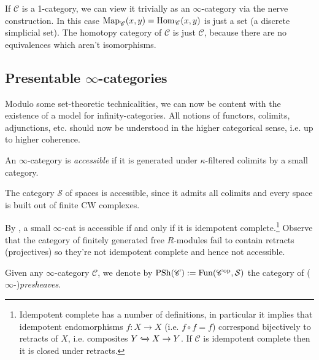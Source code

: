 \documentclass[11pt]{amsart}
\renewcommand{\Pre}{\mathrm{PSh}}
\begin{document}
\begin{example} If $\mathscr{C}$ is a 1-category, we can view it trivially as an $\infty$-category via the nerve construction. In this case $\mathrm{Map}_\mathscr{C}(x,y) = \mathrm{Hom}_\mathscr{C}(x,y)$ is just a set (a discrete simplicial set). The homotopy category of $\mathscr{C}$ is just $\mathscr{C}$, because there are no equivalences which aren't isomorphisms.
\end{example}


\subsection{Presentable $\infty$-categories}

Modulo some set-theoretic technicalities, we can now be content with the existence of a model for infinity-categories. All notions of functors, colimits, adjunctions, etc. should now be understood in the higher categorical sense, i.e. up to higher coherence.

\begin{definition} \cite[5.4.2.1]{HTT} An $\infty$-category is \textit{accessible} if it is generated under $\kappa$-filtered colimits by a small category.
\end{definition}

\begin{example}\label{ex:spaces-presentable}  The category $\mathcal{S}$ of spaces is accessible, since it admits all colimits and every space is built out of finite CW complexes.
\end{example}

\begin{remark} By \cite[5.4.3.6]{HTT}, a small $\infty$-cat is accessible if and only if it is idempotent complete.\footnote{Idempotent complete has a number of definitions, in particular it implies that idempotent endomorphisms $f \colon X \to X$ (i.e. $f\circ f = f$) correspond bijectively to retracts of $X$, i.e. composites $Y \xhookrightarrow{} X \to Y$. If $\mathscr{C}$ is idempotent complete then it is closed under retracts.} Observe that the category of finitely generated free $R$-modules fail to contain retracts (projectives) so they're not idempotent complete and hence not accessible.
\end{remark}


\begin{definition}\label{def:presheaves}  Given any $\infty$-category $\mathscr{C}$, we denote by $\Pre(\mathscr{C}) := \Fun(\mathscr{C}^\op, \mathcal{S})$ the category of ($\infty$-)\textit{presheaves}.
\end{definition}
\end{document}
